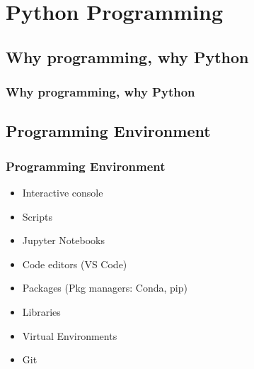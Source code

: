 



\begin{frame}
   \titlepage
\end{frame}



\begin{frame}
   \tableofcontents
\end{frame}

\section{Python Programming}


\subsection{Why programming, why Python}
\begin{frame}\frametitle{Why programming, why Python}

\end{frame}



\subsection{Programming Environment}
\begin{frame}\frametitle{Programming Environment}

      \begin{itemize}
         \item Interactive console
         \item Scripts
         \item Jupyter Notebooks
         \item Code editors (VS Code)
         \item Packages (Pkg managers: Conda, pip)
         \item Libraries
         \item Virtual Environments
         \item Git
      \end{itemize}

\end{frame}
